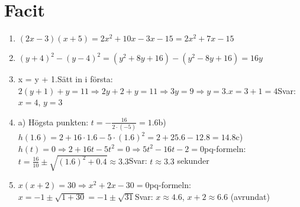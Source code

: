 \documentclass[a4paper,11pt]{article}
\begin{document}
\section*{Facit}
\begin{enumerate}[label=\textbf{\arabic*.}]
    \item $(2x - 3)(x + 5) = 2x^2 + 10x - 3x - 15 = 2x^2 + 7x - 15$
    \item $(y + 4)^2 - (y - 4)^2 = (y^2 + 8y + 16) - (y^2 - 8y + 16) = 16y$
    \item {} x = y + 1.\newline Sätt in i första: $2(y + 1) + y = 11 \Rightarrow 2y + 2 + y = 11 \Rightarrow 3y = 9 \Rightarrow y = 3$.\newline $x = 3 + 1 = 4$\newline Svar: $x=4$, $y=3$
    \item a) Högsta punkten: $t = -\frac{16}{2\cdot(-5)} = 1.6$\newline b) $h(1.6) = 2 + 16 \cdot 1.6 - 5 \cdot (1.6)^2 = 2 + 25.6 - 12.8 = 14.8$\newline c) $h(t) = 0 \Rightarrow 2 + 16t - 5t^2 = 0 \Rightarrow 5t^2 - 16t - 2 = 0$\newline pq-formeln: $t = \frac{16}{10} \pm \sqrt{(1.6)^2 + 0.4} \approx 3.3$\newline Svar: $t \approx 3.3$ sekunder
    \item $x(x+2) = 30 \Rightarrow x^2 + 2x - 30 = 0$\newline pq-formeln: $x = -1 \pm \sqrt{1 + 30} = -1 \pm \sqrt{31}$\newline Svar: $x \approx 4.6$, $x+2 \approx 6.6$ (avrundat)
\end{enumerate}
\end{document}
